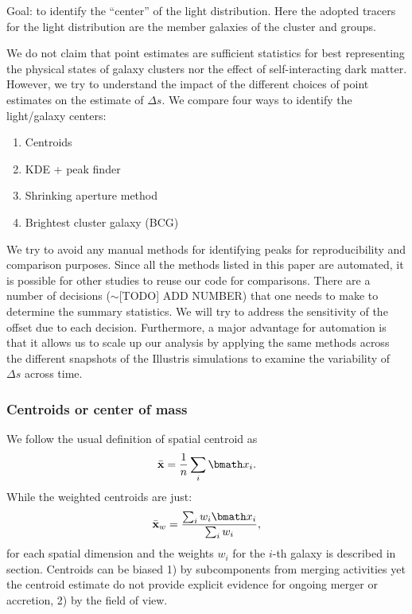 Goal: to identify the ``center'' of the light distribution. Here the adopted 
tracers for the light distribution are the member galaxies of the cluster 
and groups.

We do not claim that point estimates are sufficient statistics for
best representing the physical states of galaxy clusters nor the effect of
self-interacting dark matter. However, we try to understand the impact of the
different choices of point estimates on the estimate of $\Delta s$. 
We compare four ways to identify the light/galaxy centers:
\begin{enumerate}
\item Centroids
\item KDE + peak finder
\item Shrinking aperture method
\item Brightest cluster galaxy (BCG)

\end{enumerate}

We try to avoid any manual methods for identifying peaks for
reproducibility and comparison purposes. Since all the methods listed in this
paper are automated, it is possible for other studies to reuse our code for 
comparisons. 
There are a number of decisions ($\sim $[TODO] ADD NUMBER) that one needs to make to 
determine the summary statistics. We will try to address the sensitivity of the offset
due to each decision. 
Furthermore, a major advantage for automation is that it allows us  
to scale up our analysis by applying
the same methods across the different snapshots of the Illustris simulations to
examine the variability of $\Delta s$ across time. 


\subsubsection{Centroids or center of mass}
\label{Unweighted}
We follow the usual definition of spatial centroid as 
\begin{equation}
	\bar{\bf x} = \frac{1}{n} \sum_i \vec{x}_i. 
\end{equation}
While the weighted centroids are just: 
\begin{equation}
	\bar{\bf x}_w = \frac{\sum_i w_i \vec{x}_i}{\sum_i w_i},
\end{equation}
for each spatial dimension and the weights $w_i$ for the $i$-th galaxy
is described in section.
Centroids can be biased 1) by subcomponents from merging activities yet the
centroid estimate do not provide explicit evidence for ongoing merger or 
accretion, 2) by the field of view.


